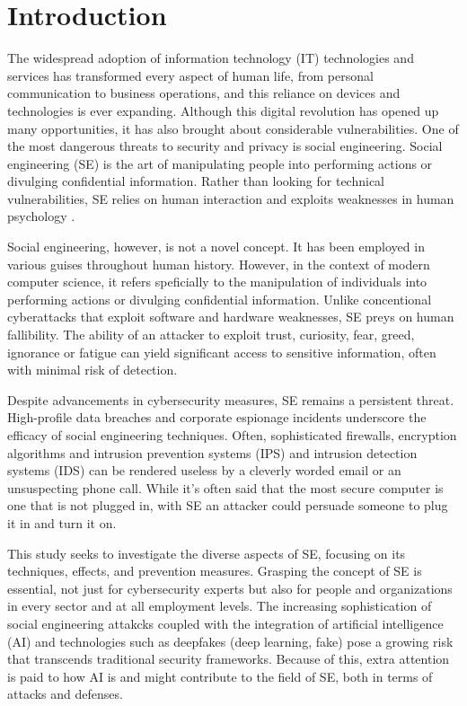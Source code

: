 
\chapter{Introduction\label{intro}}

The widespread adoption of information technology (IT) technologies and services has transformed every aspect of human life, from personal communication to business operations, and this reliance on devices and technologies is ever expanding. Although this digital revolution has opened up many opportunities, it has also brought about considerable vulnerabilities. One of the most dangerous threats to security and privacy is social engineering. Social engineering (SE) is the art of manipulating people into performing actions or divulging confidential information. Rather than looking for technical vulnerabilities, SE relies on human interaction and exploits weaknesses in human psychology \citep{wang_defining_2020}.

Social engineering, however, is not a novel concept. It has been employed in various guises throughout human history. However, in the context of modern computer science, it refers speficially to the manipulation of individuals into performing actions or divulging confidential information. Unlike concentional cyberattacks that exploit software and hardware weaknesses, SE preys on human fallibility. The ability of an attacker to exploit trust, curiosity, fear, greed, ignorance or fatigue can yield significant access to sensitive information, often with minimal risk of detection.

Despite advancements in cybersecurity measures, SE remains a persistent threat. High-profile data breaches and corporate espionage incidents underscore the efficacy of social engineering techniques. Often, sophisticated firewalls, encryption algorithms and intrusion prevention systems (IPS) and intrusion detection systems (IDS) can be rendered useless by a cleverly worded email or an unsuspecting phone call. While it's often said that the most secure computer is one that is not plugged in, with SE an attacker could persuade someone to plug it in and turn it on.

This study seeks to investigate the diverse aspects of SE, focusing on its techniques, effects, and prevention measures. Grasping the concept of SE is essential, not just for cybersecurity experts but also for people and organizations in every sector and at all employment levels. The increasing sophistication of social engineering attakcks coupled with the integration of artificial intelligence (AI) and technologies such as deepfakes (deep learning, fake) pose a growing risk that transcends traditional security frameworks. Because of this, extra attention is paid to how AI is and might contribute to the field of SE, both in terms of attacks and defenses.

